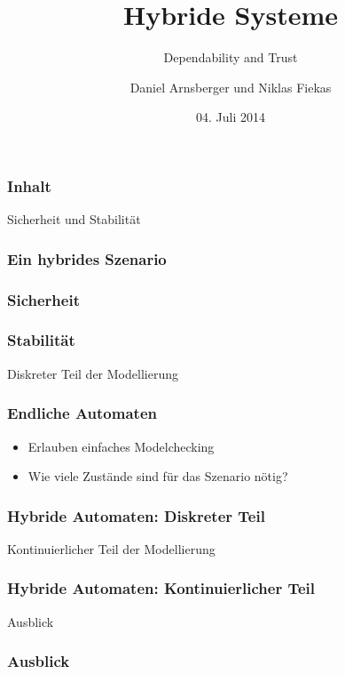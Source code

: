 \documentclass[ngerman]{beamer}
\title{Hybride Systeme}
\subtitle{Dependability and Trust}
\author{Daniel Arnsberger und Niklas Fiekas}
\institute{Institut für Informatik}
\date{04. Juli 2014}
\begin{document}
\begin{frame}
    \titlepage
\end{frame}

\begin{frame}
    \frametitle{Inhalt}
    \tableofcontents
\end{frame}

\begin{section}{Sicherheit und Stabilität}

\begin{frame}
    \frametitle{Ein hybrides Szenario}
    \begin{figure}
        \centering
        \def\svgwidth{0.9\columnwidth}
        
    \end{figure}
\end{frame}

\begin{frame}
    \frametitle{Sicherheit}
    \begin{figure}
        \centering
        \def\svgwidth{0.9\columnwidth}
        
    \end{figure}
\end{frame}

\begin{frame}
    \frametitle{Stabilität}
    \begin{figure}
        \centering
        \def\svgwidth{0.9\columnwidth}
        
    \end{figure}
\end{frame}

\end{section}
\begin{section}{Diskreter Teil der Modellierung}

\begin{frame}
    \frametitle{Endliche Automaten}

    \begin{itemize}
        \item Erlauben einfaches Modelchecking
        \item Wie viele Zustände sind für das Szenario nötig?
    \end{itemize}
\end{frame}

\begin{frame}
    \frametitle{Hybride Automaten: Diskreter Teil}
\end{frame}

\end{section}
\begin{section}{Kontinuierlicher Teil der Modellierung}

\begin{frame}
    \frametitle{Hybride Automaten: Kontinuierlicher Teil}
\end{frame}

\end{section}
\begin{section}{Ausblick}

\begin{frame}
    \frametitle{Ausblick}
\end{frame}

\end{section}
\end{document}
